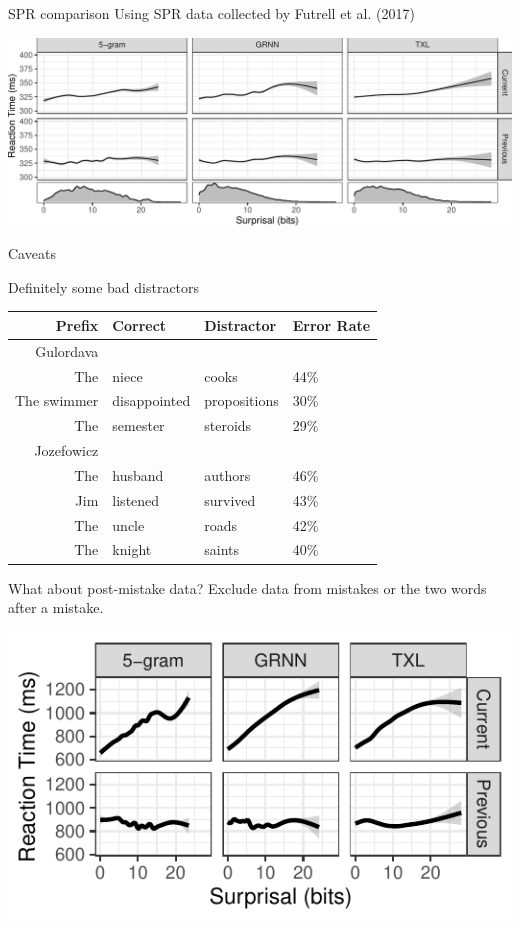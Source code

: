 \documentclass[ 12pt, xcolor=beamer,table,usenames,dvipsnames, ignorenonframetext, ngerman]{beamer}
\begin{document}
\begin{frame}{SPR comparison}
	Using SPR data collected by Futrell et al. (2017)
	
	\includegraphics[width=\textwidth]{../Images/spr_gam.pdf}
	
\end{frame}
\begin{frame}{Caveats}
	
	{\large Definitely some bad distractors}
	\begin{table}
		
		
		\begin{tabular}{rlll}
			Prefix & Correct & Distractor & Error Rate \\
			\hline
			\hline
			Gulordava&&&\\
			\hline
			The & niece & cooks & 44\%\\
			The swimmer & disappointed & propositions & 30\%\\
			The & semester & steroids & 29\%\\
			\hline
			\hline
			Jozefowicz&&&\\
			\hline
			The & husband & authors & 46\%\\
			Jim & listened & survived & 43\%\\
			The & uncle & roads & 42\%\\
			The & knight & saints & 40\%\\
		\end{tabular}
	\end{table}
	
\end{frame}


\begin{frame}{What about post-mistake data?}
	Exclude data from mistakes or the two words after a mistake. 
	
	\includegraphics[width=.9\textwidth]{../Images/gam2.pdf}	
\end{frame}
\end{document}
